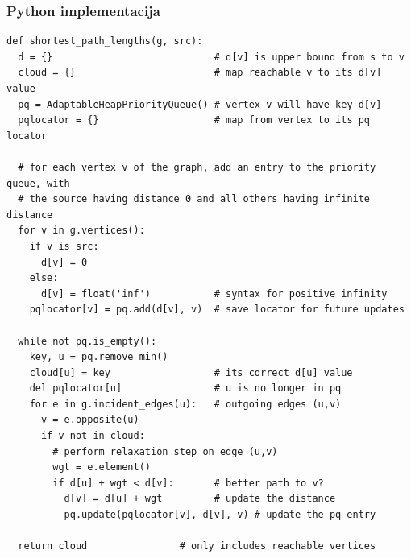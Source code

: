 \documentclass[compress]{beamer}
\begin{document}
\begin{frame}
  \frametitle{Python implementacija}
\begin{verbatim}
def shortest_path_lengths(g, src):
  d = {}                            # d[v] is upper bound from s to v
  cloud = {}                        # map reachable v to its d[v] value
  pq = AdaptableHeapPriorityQueue() # vertex v will have key d[v]
  pqlocator = {}                    # map from vertex to its pq locator

  # for each vertex v of the graph, add an entry to the priority queue, with
  # the source having distance 0 and all others having infinite distance
  for v in g.vertices():
    if v is src:
      d[v] = 0
    else:
      d[v] = float('inf')           # syntax for positive infinity
    pqlocator[v] = pq.add(d[v], v)  # save locator for future updates

  while not pq.is_empty():
    key, u = pq.remove_min()
    cloud[u] = key                  # its correct d[u] value
    del pqlocator[u]                # u is no longer in pq
    for e in g.incident_edges(u):   # outgoing edges (u,v)
      v = e.opposite(u)
      if v not in cloud:
        # perform relaxation step on edge (u,v)
        wgt = e.element()
        if d[u] + wgt < d[v]:       # better path to v?
          d[v] = d[u] + wgt         # update the distance
          pq.update(pqlocator[v], d[v], v) # update the pq entry

  return cloud                # only includes reachable vertices
\end{verbatim}
\end{frame}
\end{document}
